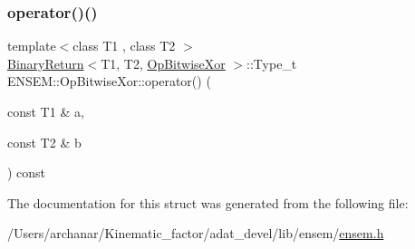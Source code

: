 \mbox{\label{structENSEM_1_1OpBitwiseXor_a591fa418b54f1df31f5b4120860f1e42}} 
\subsubsection{\texorpdfstring{operator()()}{operator()()}\hspace{0.1cm}{\footnotesize\ttfamily [2/2]}}
{\footnotesize\ttfamily template$<$class T1 , class T2 $>$ \\
\mbox{\hyperlink{structENSEM_1_1BinaryReturn}{Binary\+Return}}$<$T1, T2, \mbox{\hyperlink{structENSEM_1_1OpBitwiseXor}{Op\+Bitwise\+Xor}} $>$\+::Type\+\_\+t E\+N\+S\+E\+M\+::\+Op\+Bitwise\+Xor\+::operator() (\begin{DoxyParamCaption}\item[{const T1 \&}]{a,  }\item[{const T2 \&}]{b }\end{DoxyParamCaption}) const\hspace{0.3cm}{\ttfamily [inline]}}



The documentation for this struct was generated from the following file\+:\begin{DoxyCompactItemize}
\item 
/\+Users/archanar/\+Kinematic\+\_\+factor/adat\+\_\+devel/lib/ensem/\mbox{\hyperlink{lib_2ensem_2ensem_8h}{ensem.\+h}}\end{DoxyCompactItemize}
